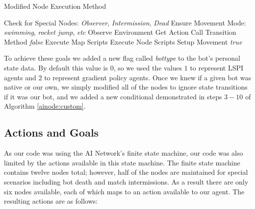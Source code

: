 \begin{algorithm}
\caption{Modified Node Execution Method}
\label{ainode:custom}
    {\fontsize{12}{10}\selectfont
    \begin{algorithmic}[1]
        \STATE Check for Special Nodes: \emph{Observer}, \emph{Intermission}, \emph{Dead}
        \STATE Ensure Movement Mode: \emph{swimming}, \emph{rocket jump}, \emph{etc}
            \STATE Observe Environment
            \STATE Get Action
                \STATE Call Transition Method
                \RETURN \emph{false}
            \ENDIF
        \ENDIF
        \STATE Execute Map Scripts
        \STATE Execute Node Scripts
        \STATE Setup Movement
        \RETURN \emph{true}
    \end{algorithmic}
    }
\end{algorithm}

To achieve these goals we added a new flag called \emph{bottype} to the bot's personal state data. By default this value is $0$, so we used the values $1$ to represent LSPI agents and $2$ to represent gradient policy agents. Once we knew if a given bot was native or our own, we simply modified all of the nodes to ignore state transitions if it was our bot, and we added a new conditional demonstrated in steps $3-10$ of Algorithm \ref{ainode:custom}.

\subsection{Actions and Goals}

As our code was using the AI Network's finite state machine, our code was also limited by the actions available in this state machine. The finite state machine contains twelve nodes total; however, half of the nodes are maintained for special scenarios including bot death and match intermissions. As a result there are only six nodes available, each of which maps to an action available to our agent. The resulting actions are as follows:

